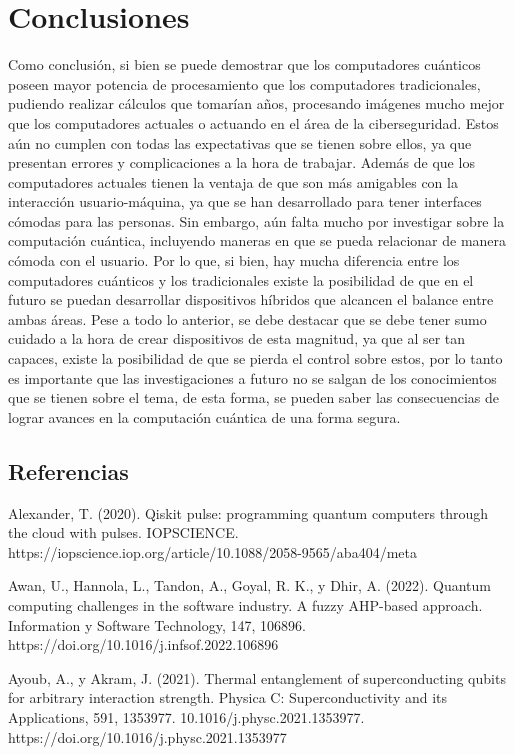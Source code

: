 \documentclass[twoside]{article}
\begin{document}
\section{Conclusiones}
Como conclusión, si bien se puede demostrar que los computadores cuánticos poseen mayor potencia de procesamiento que los computadores tradicionales, pudiendo realizar cálculos que tomarían años, procesando imágenes mucho mejor que los computadores actuales o actuando en el área de la ciberseguridad. Estos aún no cumplen con todas las expectativas que se tienen sobre ellos, ya que presentan errores y complicaciones a la hora de trabajar. Además de que los computadores actuales tienen la ventaja de que son más amigables con la interacción usuario-máquina, ya que se han desarrollado para tener interfaces cómodas para las personas. Sin embargo, aún falta mucho por investigar sobre la computación cuántica, incluyendo maneras en que se pueda relacionar de manera cómoda con el usuario. Por lo que, si bien, hay mucha diferencia entre los computadores cuánticos y los tradicionales existe la posibilidad de que en el futuro se puedan desarrollar dispositivos híbridos que alcancen el balance entre ambas áreas.
Pese a todo lo anterior, se debe destacar que se debe tener sumo cuidado a la hora de crear dispositivos de esta magnitud, ya que al ser tan capaces, existe la posibilidad de que se pierda el control sobre estos, por lo tanto es importante que las investigaciones a futuro no se salgan de los conocimientos que se tienen sobre el tema, de esta forma, se pueden saber las consecuencias de lograr avances en la computación cuántica de una forma segura.




\clearpage

\subsection{Referencias}
Alexander, T. (2020). Qiskit pulse: programming quantum computers through the cloud with pulses. IOPSCIENCE. https://iopscience.iop.org/article/10.1088/2058-9565/aba404/meta

Awan, U., Hannola, L., Tandon, A., Goyal, R. K., y Dhir, A. (2022). Quantum computing challenges in the software industry. A fuzzy AHP-based approach. Information y Software Technology, 147, 106896. https://doi.org/10.1016/j.infsof.2022.106896

Ayoub, A., y Akram, J. (2021). Thermal entanglement of superconducting qubits for arbitrary interaction strength. Physica C: Superconductivity and its Applications, 591, 1353977. 10.1016/j.physc.2021.1353977.
https://doi.org/10.1016/j.physc.2021.1353977
\end{document}
